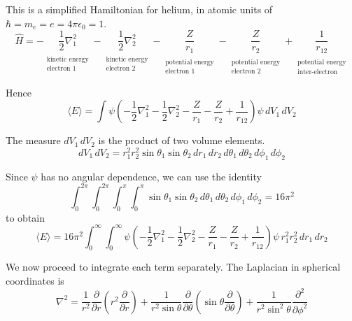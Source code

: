 \documentclass[12pt]{article}
\begin{document}
\noindent
This is a simplified Hamiltonian for helium, in atomic units of $\hbar=m_e=e=4\pi\epsilon_0=1$.
\begin{equation*}
\hat{H}=
-\underset{\substack{\\[1ex]\text{kinetic energy}\\\text{electron 1}}}{\frac{1}{2}\nabla^2_1}
-\underset{\substack{\\[1ex]\text{kinetic energy}\\\text{electron 2}}}{\frac{1}{2}\nabla^2_2}
-\underset{\substack{\\[1ex]\text{potential energy}\\\text{electron 1}}}{\frac{Z}{r_1}}
-\underset{\substack{\\[1ex]\text{potential energy}\\\text{electron 2}}}{\frac{Z}{r_2}}
+\underset{\substack{\\[1ex]\text{potential energy}\\\text{inter-electron}}}{\frac{1}{r_{12}}}
\end{equation*}

\noindent
Hence
\begin{equation*}
\langle E\rangle=
\int\psi\left(
-\frac{1}{2}\nabla^2_1
-\frac{1}{2}\nabla^2_2
-\frac{Z}{r_1}
-\frac{Z}{r_2}
+\frac{1}{r_{12}}
\right)\psi\,dV_1\,dV_2
\end{equation*}

\noindent
The measure $dV_1\,dV_2$ is the product of two volume elements.
\begin{equation*}
dV_1\,dV_2=r_1^2 r_2^2 \sin\theta_1 \sin\theta_2
\,dr_1\,dr_2\,d\theta_1\,d\theta_2\,d\phi_1\,d\phi_2
\end{equation*}

\noindent
Since $\psi$ has no angular dependence, we can use the identity
\begin{equation*}
\int_0^{2\pi}\int_0^{2\pi}\int_0^\pi\int_0^\pi\sin\theta_1\sin\theta_2
\,d\theta_1\,d\theta_2\,d\phi_1\,d\phi_2=16\pi^2
\tag{1}
\end{equation*}
to obtain
\begin{equation*}
\langle E\rangle=16\pi^2\int_0^\infty\int_0^\infty
\psi\left(
-\frac{1}{2}\nabla^2_1
-\frac{1}{2}\nabla^2_2
-\frac{Z}{r_1}
-\frac{Z}{r_2}
+\frac{1}{r_{12}}
\right)\psi
\,r_1^2 r_2^2
\,dr_1\,dr_2
\end{equation*}

\noindent
We now proceed to integrate each term separately.
The Laplacian in spherical coordinates is
\begin{equation*}
\nabla^2=\frac{1}{r^2}\frac{\partial}{\partial r}
\left(r^2\frac{\partial}{\partial r}\right)
+
\frac{1}{r^2\sin\theta}\frac{\partial}{\partial\theta}
\left(\sin\theta\frac{\partial}{\partial\theta}\right)
+
\frac{1}{r^2\sin^2\theta}\frac{\partial^2}{\partial\phi^2}
\end{equation*}
\end{document}

